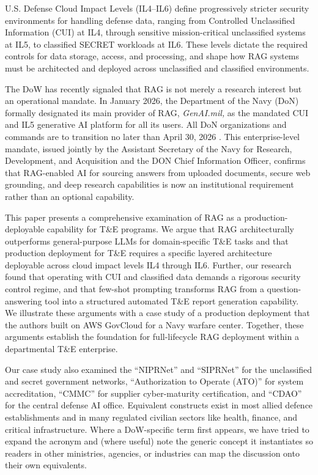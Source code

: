 \documentclass[12pt,letterpaper]{article}
\let\cite\parencite
\begin{document}
U.S. Defense Cloud Impact Levels (IL4--IL6) define progressively stricter security environments for handling defense data, ranging from Controlled Unclassified Information (CUI) at IL4, through sensitive mission-critical unclassified systems at IL5, to classified SECRET workloads at IL6. These levels dictate the required controls for data storage, access, and processing, and shape how RAG systems must be architected and deployed across unclassified and classified environments.

The DoW has recently signaled that RAG is not merely a research interest but an operational mandate. In January 2026, the Department of the Navy (DoN) formally designated its main provider of RAG, \textit{GenAI.mil,} as the mandated CUI and IL5 generative AI platform for all its users. All DoN organizations and commands are to transition no later than April 30, 2026 \cite{don_genai2026}. This enterprise-level mandate, issued jointly by the Assistant Secretary of the Navy for Research, Development, and Acquisition and the DON Chief Information Officer, confirms that RAG-enabled AI for sourcing answers from uploaded documents, secure web grounding, and deep research capabilities is now an institutional requirement rather than an optional capability.

This paper presents a comprehensive examination of RAG as a production-deployable capability for T\&E programs. We argue that RAG architecturally outperforms general-purpose LLMs for domain-specific T\&E tasks and that production deployment for T\&E requires a specific layered architecture deployable across cloud impact levels IL4 through IL6. Further, our research found that operating with CUI and classified data demands a rigorous security control regime, and that few-shot prompting transforms RAG from a question-answering tool into a structured automated T\&E report generation capability. We illustrate these arguments with a case study of a production deployment that the authors built on AWS GovCloud for a Navy warfare center. Together, these arguments establish the foundation for full-lifecycle RAG deployment within a departmental T\&E enterprise.

Our case study also examined the ``NIPRNet'' and ``SIPRNet'' for the unclassified and secret government networks, ``Authorization to Operate (ATO)'' for system accreditation, ``CMMC'' for supplier cyber-maturity certification, and ``CDAO'' for the central defense AI office. Equivalent constructs exist in most allied defence establishments and in many regulated civilian sectors like health, finance, and critical infrastructure. Where a DoW-specific term first appears, we have tried to expand the acronym and (where useful) note the generic concept it instantiates so readers in other ministries, agencies, or industries can map the discussion onto their own equivalents.
\end{document}
